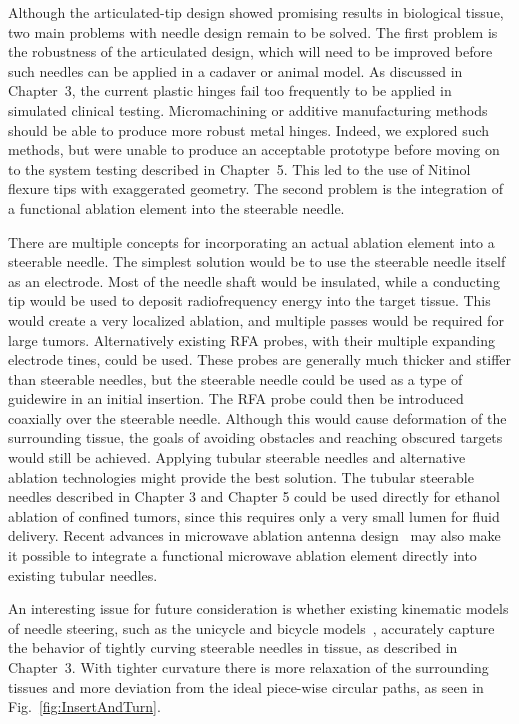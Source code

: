 Although the articulated-tip design showed promising results in biological tissue, two main problems with needle design remain to be solved. The first problem is the robustness of the articulated design, which will need to be improved before such needles can be applied in a cadaver or animal model. As discussed in Chapter~3, the current plastic hinges fail too frequently to be applied in simulated clinical testing. Micromachining or additive manufacturing methods should be able to produce more robust metal hinges. Indeed, we explored such methods, but were unable to produce an acceptable prototype before moving on to the system testing described in Chapter~5. This led to the use of Nitinol flexure tips with exaggerated geometry. The second problem is the integration of a functional ablation element into the steerable needle.

There are multiple concepts for incorporating an actual ablation element into a steerable needle. The simplest solution would be to use the steerable needle itself as an electrode. Most of the needle shaft would be insulated, while a conducting tip would be used to deposit radiofrequency energy into the target tissue. This would create a very localized ablation, and multiple passes would be required for large tumors. Alternatively existing RFA probes, with their multiple expanding electrode tines, could be used. These probes are generally much thicker and stiffer than steerable needles, but the steerable needle could be used as a type of guidewire in an initial insertion. The RFA probe could then be introduced coaxially over the steerable needle. Although this would cause deformation of the surrounding tissue, the goals of avoiding obstacles and reaching obscured targets would still be achieved. Applying tubular steerable needles and alternative ablation technologies might provide the best solution. The tubular steerable needles described in Chapter 3 and Chapter 5 could be used directly for ethanol ablation of confined tumors, since this requires only a very small lumen for fluid delivery. Recent advances in microwave ablation antenna design~\cite{Luyen2014,Luyen2015} may also make it possible to integrate a functional microwave ablation element directly into existing tubular needles. 

An interesting issue for future consideration is whether existing kinematic models of needle steering, such as the unicycle and bicycle models~\cite{Webster2006,Park2005}, accurately capture the behavior of tightly curving steerable needles in tissue, as described in Chapter~3. With tighter curvature there is more relaxation of the surrounding tissues and more deviation from the ideal piece-wise circular paths, as seen in Fig.~\ref{fig:InsertAndTurn}.

